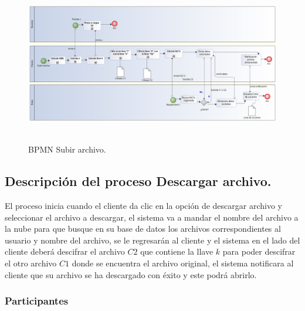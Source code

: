 \begin{figure}[H]
\centering
\includegraphics[width=17cm, height=7cm]{./images/BPM_Subir.png}
\caption{BPMN Subir archivo.}

\end{figure}


\subsection{Descripción del proceso Descargar archivo.}

El proceso inicia cuando el cliente da clic en la opción de descargar archivo y seleccionar el archivo a descargar, el sistema va a mandar el nombre del archivo a la nube para que busque en su base de datos los archivos correspondientes al usuario y nombre del archivo, se le regresarán al cliente y el sistema en el lado del cliente deberá descifrar el archivo $C2$ que contiene la llave $k$ para poder descifrar el otro archivo $C1$ donde se encuentra el archivo original, el sistema notificara al cliente que su archivo se ha descargado con éxito y este podrá abrirlo. \\


\subsubsection{Participantes}

